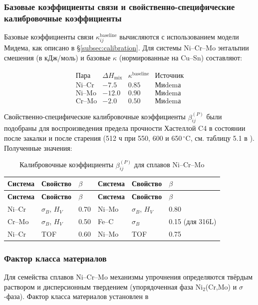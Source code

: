 \documentclass[12pt,a4paper]{article}
\begin{document}
	\subsubsection{Базовые коэффициенты связи и свойственно-специфические калибровочные коэффициенты}
	Базовые коэффициенты связи $\kappa_{ij}^{\text{baseline}}$ вычисляются с использованием модели Мидема, как описано в \S\ref{subsec:calibration}. Для системы Ni–Cr–Mo энтальпии смешения (в кДж/моль) и базовые $\kappa$ (нормированные на Cu–Sn) составляют:
	
	\[
	\begin{array}{lccc}
		\text{Пара} & \Delta H_{\text{mix}} & \kappa^{\text{baseline}} & \text{Источник} \\
		\hline
		\text{Ni–Cr} & -7.5 & 0.85 & \text{Миdemа} \\
		\text{Ni–Mo} & -12.0 & 0.90 & \text{Миdemа} \\
		\text{Cr–Mo} & -2.0 & 0.50 & \text{Миdemа}
	\end{array}
	\]
	
	Свойственно-специфические калибровочные коэффициенты $\beta_{ij}^{(P)}$ были подобраны для воспроизведения предела прочности Хастеллой C4 в состоянии после закалки и после старения (512 ч при 550, 600 и 650\,\(^{\circ}\)C, см. таблицу 5.1 в \cite{dis2025}). Полученные значения:
	
	\begin{longtable}{p{1.5cm} p{1.5cm} p{1.5cm} p{1.5cm} p{1.5cm} p{1.5cm}}
		\caption{Калибровочные коэффициенты $\beta_{ij}^{(P)}$ для сплавов Ni–Cr–Mo}\label{tab:nicrmo_beta}\\
		\toprule
		\textbf{Система} & \textbf{Свойство} & \(\beta\) & \textbf{Система} & \textbf{Свойство} & \(\beta\) \\
		\midrule
		\endfirsthead
		\toprule
		\textbf{Система} & \textbf{Свойство} & \(\beta\) & \textbf{Система} & \textbf{Свойство} & \(\beta\) \\
		\midrule
		\endhead
		Ni–Cr   & \(\sigma_B\), \(H_V\) & 0.70 & Ni–Mo   & \(\sigma_B\), \(H_V\) & 0.80 \\
		Cr–Mo   & \(\sigma_B\), \(H_V\) & 0.50 & Fe–C    & \(\sigma_B\)        & 0.15 (для 316L) \\
		Ni–Cr   & TOF              & 0.60 & Ni–Mo   & TOF              & 0.75 \\
		\bottomrule
	\end{longtable}
	
	\subsubsection{Фактор класса материалов}
	Для семейства сплавов Ni–Cr–Mo механизмы упрочнения определяются твёрдым раствором и дисперсионным твердением (упорядоченная фаза Ni$_2$(Cr,Mo) и $\sigma$-фаза). Фактор класса материалов установлен в
	
\end{document}
